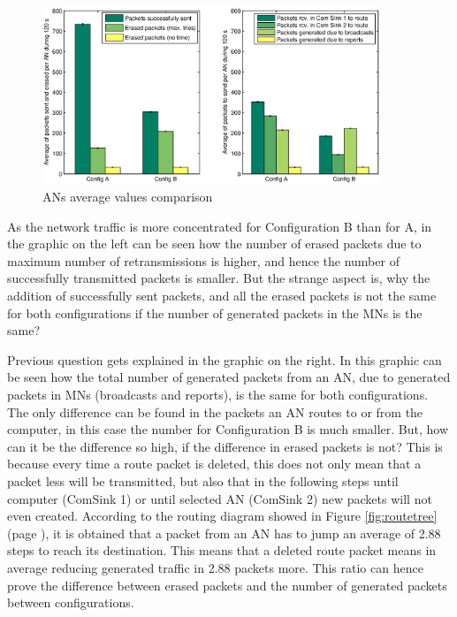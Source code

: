 \begin{figure}[ht]
 \begin{center}
  \includegraphics[width=0.9\textwidth]{ANsConparison.eps}
 \end{center}
 \caption{\acp{AN} average values comparison}
 \label{fig:ANsConparison}
\end{figure}

As the network traffic is more concentrated for Configuration B than for A, in the graphic on the left can be seen how the number of erased 
packets due to maximum number of retransmissions is higher, and hence the number of successfully transmitted packets is smaller. But the 
strange aspect is, why the addition of successfully sent packets, and all the erased packets is not the same for both configurations if the 
number of generated packets in the \acp{MN} is the same? 

Previous question gets explained in the graphic on the right. In this graphic can be seen how the total number of generated packets from an 
\ac{AN}, due to generated packets in \acp{MN} (broadcasts and reports), is the same for both configurations. The only difference can be 
found in the packets an \ac{AN} routes to or from the computer, in this case the number for Configuration B is much smaller. But, how can it 
be the difference so high, if the difference in erased packets is not? This is because every time a route packet is deleted, this does not only
mean that a packet less will be transmitted, but also that in the following steps until computer (ComSink 1) or until selected \ac{AN} (ComSink
2) new packets will not even created. According to the routing diagram showed in Figure \ref{fig:routetree} (page \pageref{fig:routetree}), it is
obtained that a packet from an \ac{AN} has to jump an average of 2.88 steps to reach its destination. This means that a deleted 
route packet means in average reducing generated traffic in 2.88 packets more. This ratio can hence prove the difference between erased packets
and the number of generated packets between configurations.

